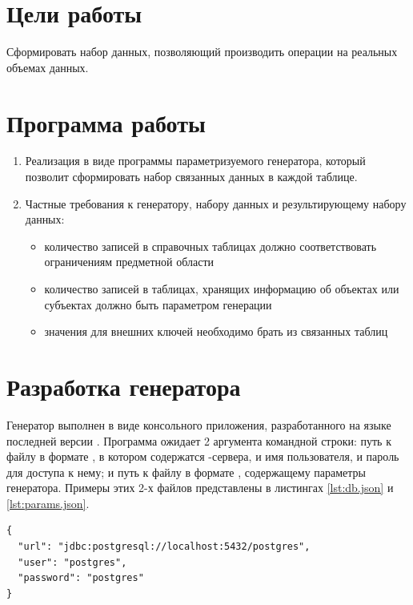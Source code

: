 





\tableofcontents
\newpage

\section{Цели работы}

Сформировать набор данных, позволяющий производить операции на реальных объемах данных. 

\section{Программа работы}

\begin{enumerate}
	\item Реализация в виде программы параметризуемого генератора, который позволит сформировать набор связанных данных в каждой таблице.
	\item Частные требования к генератору, набору данных и результирующему набору данных:
	\begin{itemize}
		\item количество записей в справочных таблицах должно соответствовать ограничениям предметной области
		\item количество записей в таблицах, хранящих информацию об объектах или субъектах должно быть параметром генерации
		\item значения для внешних ключей необходимо брать из связанных таблиц
	\end{itemize}
 
\end{enumerate}
 
\section{Разработка генератора} 

Генератор выполнен в виде консольного приложения, разработанного на языке  последней версии . Программа ожидает 2 аргумента командной строки: путь к файлу в формате , в котором содержатся  -сервера, и имя пользователя, и пароль для доступа к нему; и путь к файлу в формате , содержащему параметры генератора. Примеры этих 2-х файлов представлены в листингах \ref{lst:db.json} и \ref{lst:params.json}.

\begin{lstlisting}[label={lst:db.json},caption={Пример параметров доступа к \code{Postgres}-серверу}]
{
  "url": "jdbc:postgresql://localhost:5432/postgres",
  "user": "postgres",
  "password": "postgres"
}
\end{lstlisting}

